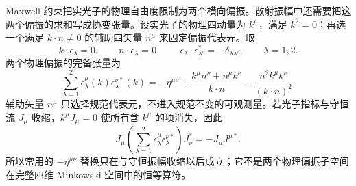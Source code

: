 
Maxwell 约束把实光子的物理自由度限制为两个横向偏振。散射振幅中还需要把这两个偏振的求和写成协变张量。设实光子的物理四动量为 $k^\mu$，满足 $k^2=0$；再选一个满足 $k\!\cdot n\neq0$ 的辅助四矢量 $n^\mu$ 来固定偏振代表元。取
\begin{equation}
 k\!\cdot\epsilon_\lambda=0,
 \qquad
 n\!\cdot\epsilon_\lambda=0,
 \qquad
 \epsilon_\lambda\!\cdot\epsilon_{\lambda'}^*=-\delta_{\lambda\lambda'},
 \qquad \lambda=1,2.
 \label{eq:physical-photon-polarization-constraints-r68}
\end{equation}
两个物理偏振的完备张量为
\begin{equation}
 \boxed{
 \sum_{\lambda=1}^{2}
 \epsilon_\lambda^\mu(k)\epsilon_\lambda^{\nu *}(k)
 =-\eta^{\mu\nu}
 +\frac{k^\mu n^\nu+n^\mu k^\nu}{k\!\cdot n}
 -\frac{n^2k^\mu k^\nu}{(k\!\cdot n)^2}.}
 \label{eq:physical-photon-polarization-projector-dp42}
\end{equation}
辅助矢量 $n^\mu$ 只选择规范代表元，不进入规范不变的可观测量。若光子指标与守恒流 $J_\mu$ 收缩，$k^\mu J_\mu=0$ 使所有含 $k^\mu$ 的项消失，因此
\begin{equation}
 \boxed{
 J_\mu
 \left(\sum_{\lambda=1}^{2}
 \epsilon_\lambda^\mu\epsilon_\lambda^{\nu *}\right)
 J_\nu^*
 =-J_\mu J^{\mu *}.}
 \label{eq:physical-photon-polarization-conserved-current-dp42}
\end{equation}
所以常用的 $-\eta^{\mu\nu}$ 替换只在与守恒振幅收缩以后成立；它不是两个物理偏振子空间在完整四维 Minkowski 空间中的恒等算符。

